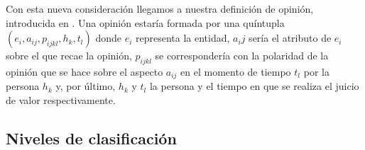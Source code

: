 	Con esta nueva consideración llegamos a nuestra definición de opinión, introducida en \cite{liu}. Una opinión estaría formada por una quíntupla $(e_i, a_{ij}, p_{ijkl}, h_{k}, t_{l})$ donde $e_i$ representa la entidad, $a_ij$ sería el atributo de $e_i$ sobre el que recae la opinión, $p_{ijkl}$ se correspondería con la polaridad de la opinión que se hace sobre el aspecto $a_{ij}$ en el momento de tiempo $t_{l}$ por la persona $h_{k}$ y, por último, $h_{k}$ y $t_{l}$ la persona y el tiempo en que se realiza el juicio de valor respectivamente.
		 
		
	\subsection{Niveles de clasificación}\label{nivelesSA}
	
